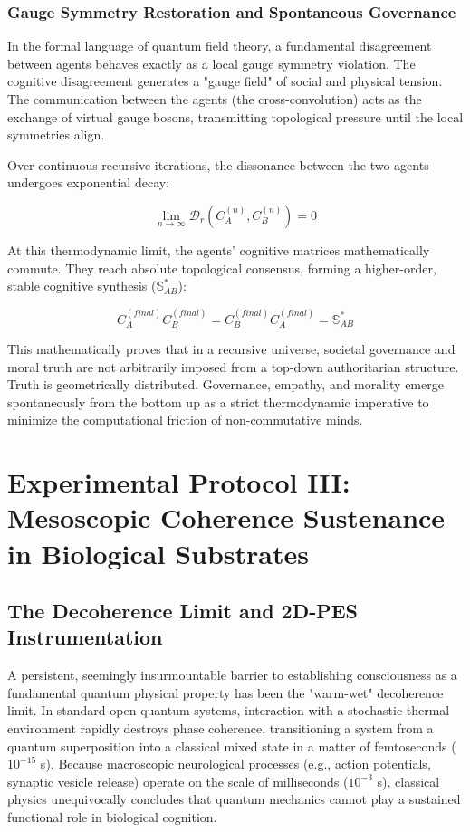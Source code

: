 \documentclass[12pt,openany]{book}
\begin{document}
\subsection{Gauge Symmetry Restoration and Spontaneous Governance}
In the formal language of quantum field theory, a fundamental disagreement between agents behaves exactly as a local gauge symmetry violation. The cognitive disagreement generates a "gauge field" of social and physical tension. The communication between the agents (the cross-convolution) acts as the exchange of virtual gauge bosons, transmitting topological pressure until the local symmetries align.

Over continuous recursive iterations, the dissonance between the two agents undergoes exponential decay:

\begin{equation}
\lim_{n \to \infty} \mathcal{D}_r(C_A^{(n)}, C_B^{(n)}) = 0
\end{equation}

At this thermodynamic limit, the agents' cognitive matrices mathematically commute. They reach absolute topological consensus, forming a higher-order, stable cognitive synthesis ($\mathbb{S}_{AB}^*$):

\begin{equation}
C_A^{(final)} C_B^{(final)} = C_B^{(final)} C_A^{(final)} = \mathbb{S}_{AB}^*
\end{equation}

This mathematically proves that in a recursive universe, societal governance and moral truth are not arbitrarily imposed from a top-down authoritarian structure. Truth is geometrically distributed. Governance, empathy, and morality emerge spontaneously from the bottom up as a strict thermodynamic imperative to minimize the computational friction of non-commutative minds.

\chapter{Experimental Protocol III: Mesoscopic Coherence Sustenance in Biological Substrates}

\section{The Decoherence Limit and 2D-PES Instrumentation}
A persistent, seemingly insurmountable barrier to establishing consciousness as a fundamental quantum physical property has been the "warm-wet" decoherence limit. In standard open quantum systems, interaction with a stochastic thermal environment rapidly destroys phase coherence, transitioning a system from a quantum superposition into a classical mixed state in a matter of femtoseconds ($10^{-15}$ s). Because macroscopic neurological processes (e.g., action potentials, synaptic vesicle release) operate on the scale of milliseconds ($10^{-3}$ s), classical physics unequivocally concludes that quantum mechanics cannot play a sustained functional role in biological cognition. 
\end{document}
